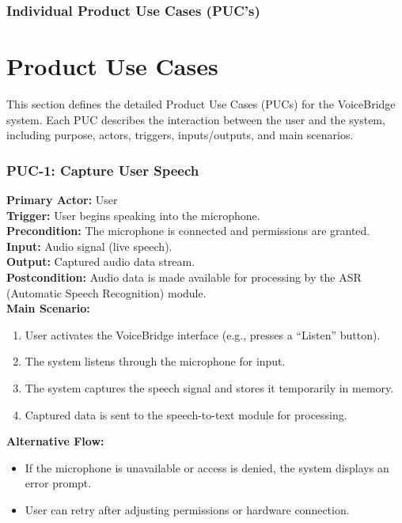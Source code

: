 \documentclass[12pt]{article}
\begin{document}
\subsubsection{Individual Product Use Cases (PUC's)}
\section*{Product Use Cases}

This section defines the detailed Product Use Cases (PUCs) for the VoiceBridge system. Each PUC describes the interaction between the user and the system, including purpose, actors, triggers, inputs/outputs, and main scenarios.

\subsubsection*{PUC-1: Capture User Speech}
\textbf{Primary Actor:} User \\
\textbf{Trigger:} User begins speaking into the microphone. \\
\textbf{Precondition:} The microphone is connected and permissions are granted. \\
\textbf{Input:} Audio signal (live speech). \\
\textbf{Output:} Captured audio data stream. \\
\textbf{Postcondition:} Audio data is made available for processing by the ASR (Automatic Speech Recognition) module. \\

\textbf{Main Scenario:}
\begin{enumerate}
  \item User activates the VoiceBridge interface (e.g., presses a “Listen” button).
  \item The system listens through the microphone for input.
  \item The system captures the speech signal and stores it temporarily in memory.
  \item Captured data is sent to the speech-to-text module for processing.
\end{enumerate}

\textbf{Alternative Flow:}
\begin{itemize}
  \item If the microphone is unavailable or access is denied, the system displays an error prompt.
  \item User can retry after adjusting permissions or hardware connection.
\end{itemize}
\end{document}
